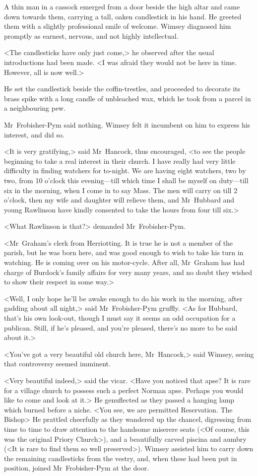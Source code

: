 A thin man in a cassock emerged from a door beside the high altar and came down towards them, carrying a tall, oaken candlestick in his hand. He greeted them with a slightly professional smile of welcome. Wimsey diagnosed him promptly as earnest, nervous, and not highly intellectual.

<The candlesticks have only just come,> he observed after the usual introductions had been made. <I was afraid they would not be here in time. However, all is now well.>

He set the candlestick beside the coffin-trestles, and proceeded to decorate its brass spike with a long candle of unbleached wax, which he took from a parcel in a neighbouring pew.

Mr~Frobisher-Pym said nothing. Wimsey felt it incumbent on him to express his interest, and did so.

<It is very gratifying,> said Mr~Hancock, thus encouraged, <to see the people beginning to take a real interest in their church. I have really had very little difficulty in finding watchers for to-night. We are having eight watchers, two by two, from 10 o'clock this evening—till which time I shall be myself on duty—till six in the morning, when I come in to say Mass. The men will carry on till 2 o'clock, then my wife and daughter will relieve them, and Mr~Hubbard and young Rawlinson have kindly consented to take the hours from four till six.>

<What Rawlinson is that?> demanded Mr~Frobisher-Pym.

<Mr~Graham's clerk from Herriotting. It is true he is not a member of the parish, but he was born here, and was good enough to wish to take his turn in watching. He is coming over on his motor-cycle. After all, Mr~Graham has had charge of Burdock's family affairs for very many years, and no doubt they wished to show their respect in some way.>

<Well, I only hope he'll be awake enough to do his work in the morning, after gadding about all night,> said Mr~Frobisher-Pym gruffly. <As for Hubbard, that's his own look-out, though I must say it seems an odd occupation for a publican. Still, if he's pleased, and you're pleased, there's no more to be said about it.>

<You've got a very beautiful old church here, Mr~Hancock,> said Wimsey, seeing that controversy seemed imminent.

<Very beautiful indeed,> said the vicar. <Have you noticed that apse? It is rare for a village church to possess such a perfect Norman apse. Perhaps you would like to come and look at it.> He genuflected as they passed a hanging lamp which burned before a niche. <You see, we are permitted Reservation. The Bishop\longdash> He prattled cheerfully as they wandered up the chancel, digressing from time to time to draw attention to the handsome miserere seats (<Of course, this was the original Priory Church>), and a beautifully carved piscina and aumbry (<It is rare to find them so well preserved>). Wimsey assisted him to carry down the remaining candlesticks from the vestry, and, when these had been put in position, joined Mr~Frobisher-Pym at the door.


